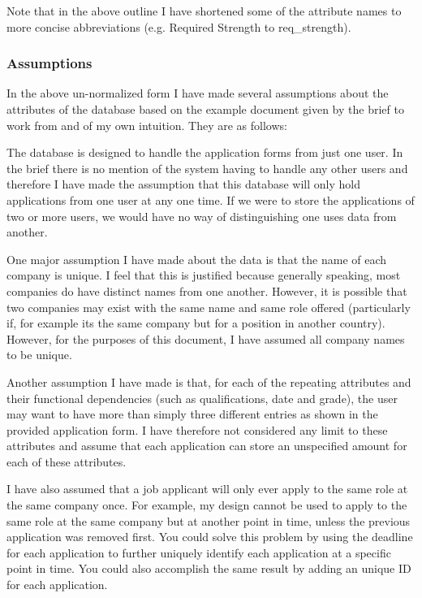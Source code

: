 \documentclass{article}
\begin{document}
Note that in the above outline I have shortened some of the attribute names to more concise abbreviations (e.g. Required Strength to req\_strength).

\subsubsection{Assumptions}

In the above un-normalized form I have made several assumptions about the attributes of the database based on the example document given by the brief to work from and of my own intuition. They are as follows:

The database is designed to handle the application forms from just one user. In the brief there is no mention of the system having to handle any other users and therefore I have made the assumption that this database will only hold applications from one user at any one time. If we were to store the applications of two or more users, we would have no way of distinguishing one uses data from another.

One major assumption I have made about the data is that the name of each company is unique. I feel that this is justified because generally speaking, most companies do have distinct names from one another. However, it is possible that two companies may exist with the same name and same role offered (particularly if, for example its the same company but for a position in another country). However, for the purposes of this document, I have assumed all company names to be unique.

Another assumption I have made is that, for each of the repeating attributes and their functional dependencies (such as qualifications, date and grade), the user may want to have more than simply three different entries as shown in the provided application form. I have therefore not considered any limit to these attributes and assume that each application can store an unspecified amount for each of these attributes.

I have also assumed that a job applicant will only ever apply to the same role at the same company once. For example, my design cannot be used to apply to the same role at the same company but at another point in time, unless the previous application was removed first. You could solve this problem by using the deadline for each application to further uniquely identify each application at a specific point in time. You could also accomplish the same result by adding an unique ID for each application.
\end{document}
